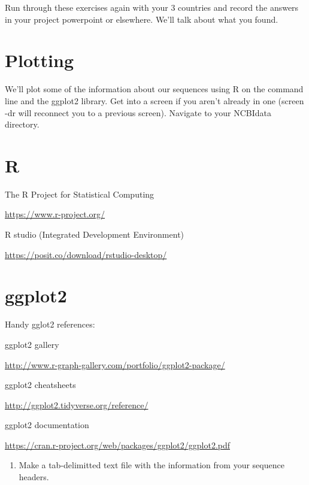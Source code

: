 \documentclass[
]{book}
\providecommand{\tightlist}{%
  \setlength{\itemsep}{0pt}\setlength{\parskip}{0pt}}
\begin{document}
Run through these exercises again with your 3 countries and record the answers in your project powerpoint or elsewhere. We'll talk about what you found.

\hypertarget{plotting}{%
\section{Plotting}\label{plotting}}

We'll plot some of the information about our sequences using R on the command line and the ggplot2 library. Get into a screen if you aren't already in one (screen -dr will reconnect you to a previous screen). Navigate to your NCBIdata directory.

\hypertarget{r}{%
\section{R}\label{r}}

The R Project for Statistical Computing

\url{https://www.r-project.org/}

R studio (Integrated Development Environment)

\url{https://posit.co/download/rstudio-desktop/}

\hypertarget{ggplot2}{%
\section{ggplot2}\label{ggplot2}}

Handy gglot2 references:

ggplot2 gallery

\url{http://www.r-graph-gallery.com/portfolio/ggplot2-package/}

ggplot2 cheatsheets

\url{http://ggplot2.tidyverse.org/reference/}

ggplot2 documentation

\url{https://cran.r-project.org/web/packages/ggplot2/ggplot2.pdf}

\hfill\break

\begin{enumerate}
\def\labelenumi{\arabic{enumi}.}
\setcounter{enumi}{10}
\tightlist
\item
  Make a tab-delimitted text file with the information from your sequence headers.
\end{enumerate}
\end{document}
